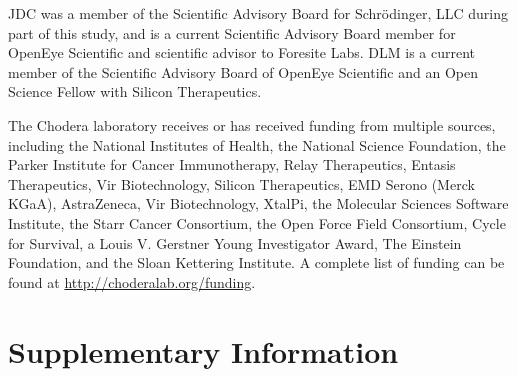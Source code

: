 \documentclass[9pt,lineno,final]{elife}
\newcommand{\beginsupplement}{%
        \setcounter{table}{0}
        \renewcommand{\thetable}{S\arabic{table}}%
        \setcounter{figure}{0}
        \renewcommand{\thefigure}{S\arabic{figure}}%
     }
\begin{document}
JDC was a member of the Scientific Advisory Board for Schr\"{o}dinger, LLC during part of this study, and is a current Scientific Advisory Board member for OpenEye Scientific and scientific advisor to Foresite Labs.
DLM is a current member of the Scientific Advisory Board of OpenEye Scientific and an Open Science Fellow with Silicon Therapeutics.

The Chodera laboratory receives or has received funding from multiple sources, including the National Institutes of Health, the National Science Foundation, the Parker Institute for Cancer Immunotherapy, Relay Therapeutics, Entasis Therapeutics, Vir Biotechnology, Silicon Therapeutics, EMD Serono (Merck KGaA), AstraZeneca, Vir Biotechnology, XtalPi, the Molecular Sciences Software Institute, the Starr Cancer Consortium, the Open Force Field Consortium, Cycle for Survival, a Louis V. Gerstner Young Investigator Award, The Einstein Foundation, and the Sloan Kettering Institute.
A complete list of funding can be found at \url{http://choderalab.org/funding}.






\newpage
\beginsupplement
\section{Supplementary Information}
\end{document}
